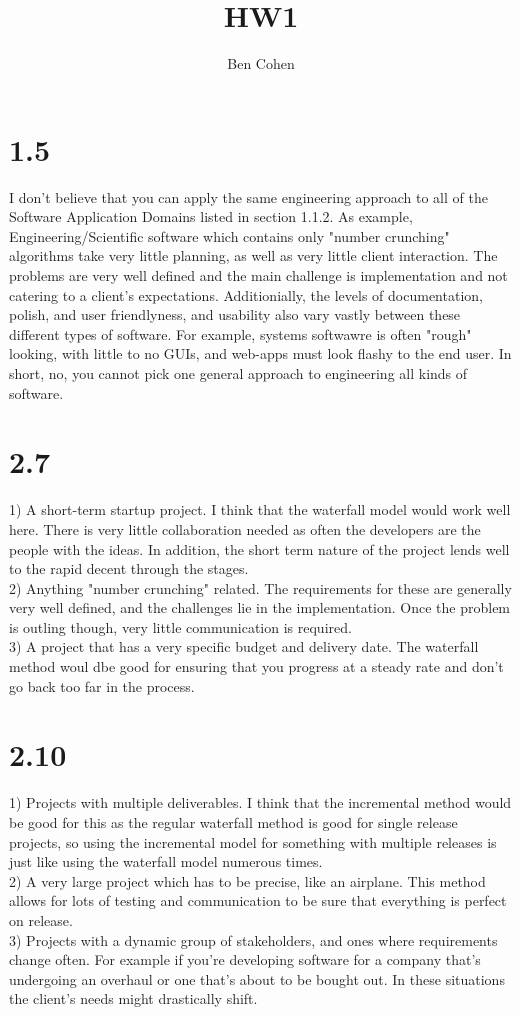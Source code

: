 \documentclass{article}
\title{HW1}
\author{Ben Cohen}
\begin{document}
\maketitle
\section*{1.5}
I don't believe that you can apply the same engineering approach to all of the Software Application Domains listed in section 1.1.2.  As example, Engineering/Scientific software which contains only "number crunching" algorithms take very little planning, as well as very little client interaction.  The problems are very well defined and the main challenge is implementation and not catering to a client's expectations.  Additionially, the levels of documentation, polish, and user friendlyness, and usability also vary vastly between these different types of software.  For example, systems softwawre is often "rough" looking, with little to no GUIs, and web-apps must look flashy to the end user.  In short, no, you cannot pick one general approach to engineering all kinds of software.
\section*{2.7}
1) A short-term startup project.  I think that the waterfall model would work well here.  There is very little collaboration needed as often the developers are the people with the ideas.  In addition, the short term nature of the project lends well to the rapid decent through the stages.\\
2) Anything "number crunching" related.  The requirements for these are generally very well defined, and the challenges lie in the implementation.  Once the problem is outling though, very little communication is required.  \\
3) A project that has a very specific budget and delivery date.  The waterfall method woul dbe good for ensuring that you progress at a steady rate and don't go back too far in the process.  
\section*{2.10}
1) Projects with multiple deliverables.  I think that the incremental method would be good for this as the regular waterfall method is good for single release projects, so using the incremental model for something with multiple releases is just like using the waterfall model numerous times.\\
2) A very large project which has to be precise, like an airplane.  This method allows for lots of testing and communication to be sure that everything is perfect on release.\\
3) Projects with a dynamic group of stakeholders, and ones where requirements change often.  For example if you're developing software for a company that's undergoing an overhaul or one that's about to be bought out.  In these situations the client's needs might drastically shift.
\end{document}
